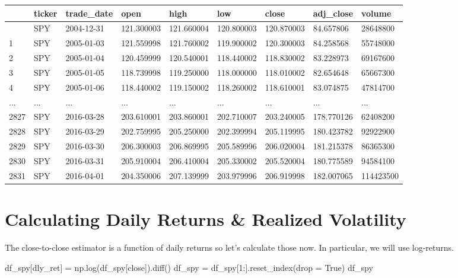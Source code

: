 \documentclass[
  letterpaper,
  DIV=11,
  numbers=noendperiod]{scrreprt}
\newenvironment{Shaded}{\begin{snugshade}}{\end{snugshade}}
\newcommand{\DecValTok}[1]{\textcolor[rgb]{0.68,0.00,0.00}{#1}}
\newcommand{\NormalTok}[1]{\textcolor[rgb]{0.00,0.23,0.31}{#1}}
\newcommand{\OperatorTok}[1]{\textcolor[rgb]{0.37,0.37,0.37}{#1}}
\newcommand{\StringTok}[1]{\textcolor[rgb]{0.13,0.47,0.30}{#1}}
\newcommand{\VariableTok}[1]{\textcolor[rgb]{0.07,0.07,0.07}{#1}}
\begin{document}
\begin{longtable}[]{@{}lllllllll@{}}
\toprule\noalign{}
& ticker & trade\_date & open & high & low & close & adj\_close &
volume \\
\midrule\noalign{}
\endhead
\bottomrule\noalign{}
\endlastfoot
0 & SPY & 2004-12-31 & 121.300003 & 121.660004 & 120.800003 & 120.870003
& 84.657806 & 28648800 \\
1 & SPY & 2005-01-03 & 121.559998 & 121.760002 & 119.900002 & 120.300003
& 84.258568 & 55748000 \\
2 & SPY & 2005-01-04 & 120.459999 & 120.540001 & 118.440002 & 118.830002
& 83.228973 & 69167600 \\
3 & SPY & 2005-01-05 & 118.739998 & 119.250000 & 118.000000 & 118.010002
& 82.654648 & 65667300 \\
4 & SPY & 2005-01-06 & 118.440002 & 119.150002 & 118.260002 & 118.610001
& 83.074875 & 47814700 \\
... & ... & ... & ... & ... & ... & ... & ... & ... \\
2827 & SPY & 2016-03-28 & 203.610001 & 203.860001 & 202.710007 &
203.240005 & 178.770126 & 62408200 \\
2828 & SPY & 2016-03-29 & 202.759995 & 205.250000 & 202.399994 &
205.119995 & 180.423782 & 92922900 \\
2829 & SPY & 2016-03-30 & 206.300003 & 206.869995 & 205.589996 &
206.020004 & 181.215378 & 86365300 \\
2830 & SPY & 2016-03-31 & 205.910004 & 206.410004 & 205.330002 &
205.520004 & 180.775589 & 94584100 \\
2831 & SPY & 2016-04-01 & 204.350006 & 207.139999 & 203.979996 &
206.919998 & 182.007065 & 114423500 \\
\end{longtable}

\hypertarget{calculating-daily-returns-realized-volatility}{%
\section{Calculating Daily Returns \& Realized
Volatility}\label{calculating-daily-returns-realized-volatility}}

The close-to-close estimator is a function of daily returns so let's
calculate those now. In particular, we will use log-returns.

\begin{Shaded}
\begin{Highlighting}[]
\NormalTok{df\_spy[}\StringTok{\textquotesingle{}dly\_ret\textquotesingle{}}\NormalTok{] }\OperatorTok{=}\NormalTok{ np.log(df\_spy[}\StringTok{\textquotesingle{}close\textquotesingle{}}\NormalTok{]).diff()}
\NormalTok{df\_spy }\OperatorTok{=}\NormalTok{ df\_spy[}\DecValTok{1}\NormalTok{:].reset\_index(drop }\OperatorTok{=} \VariableTok{True}\NormalTok{)}
\NormalTok{df\_spy}
\end{Highlighting}
\end{Shaded}
\end{document}
